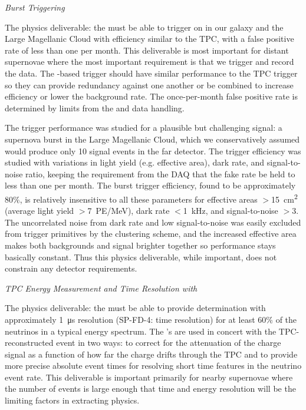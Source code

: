 \textit{Burst Triggering}

The physics deliverable: the  must be able to trigger on  in our galaxy and the Large Magellanic Cloud with efficiency similar to the TPC, with a false positive rate of less than one per month. This deliverable is most important for distant supernovae where the most important requirement is that we trigger and record the data. The -based trigger should have similar performance to the TPC trigger so they can provide redundancy against one another or be combined to increase efficiency or lower the background rate. The once-per-month false positive rate is determined by limits from the  and data handling.

The  trigger performance was studied for a plausible but challenging signal: a supernova burst in the Large Magellanic Cloud, which we conservatively assumed would produce only 10 signal events in the far detector. The trigger efficiency was studied with variations in light yield (e.g. effective area), dark rate, and signal-to-noise ratio, keeping the requirement from the DAQ that the fake rate be held to less than one per month. The burst trigger efficiency, found to be approximately $80\%$, is relatively insensitive to all these parameters for effective areas $>$\SI{15}{cm^2} (average light yield $>$\SI{7}{PE/MeV}), dark rate $<$\SI{1}{kHz}, and signal-to-noise $>3$. The uncorrelated noise from dark rate and low signal-to-noise was easily excluded from trigger primitives by the clustering scheme, and the increased effective area makes both backgrounds and signal brighter together so performance stays basically constant. Thus this physics deliverable, while important, does not constrain any detector requirements.



\textit{TPC Energy Measurement and Time Resolution with \tzero}

The physics deliverable: the  must be able to provide \tzero determination with approximately \SI{1}{\micro s} resolution (SP-FD-4: time resolution) for at least 60\% of the neutrinos in a typical  energy spectrum. The \tzero's are used in concert with the TPC-reconstructed event in two ways: to correct for the attenuation of the charge signal as a function of how far the charge drifts through the TPC and to provide more precise absolute event times for resolving short time features in the  neutrino event rate. This deliverable is important primarily for nearby supernovae where the number of events is large enough that time and energy resolution will be the limiting factors in extracting physics. 

